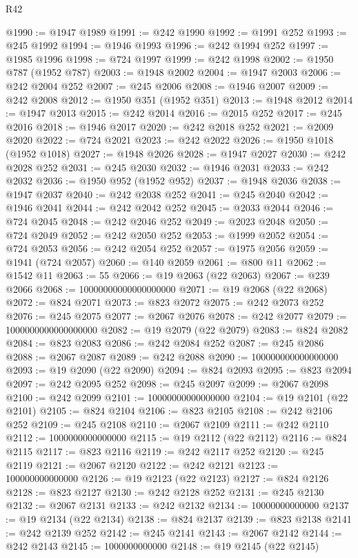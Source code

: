 \begin{lexlean}{R42}
\begin{coremodule}
{@1990 := @1947 @1989
@1991 := @242 @1990
@1992 := @1991 @252
@1993 := @245 @1992
@1994 := @1946 @1993
@1996 := @242 @1994 @252
@1997 := @1985 @1996
@1998 := @724 @1997
@1999 := @242 @1998
@2002 := @1950 @787 (@1952 @787)
@2003 := @1948 @2002
@2004 := @1947 @2003
@2006 := @242 @2004 @252
@2007 := @245 @2006
@2008 := @1946 @2007
@2009 := @242 @2008
@2012 := @1950 @351 (@1952 @351)
@2013 := @1948 @2012
@2014 := @1947 @2013
@2015 := @242 @2014
@2016 := @2015 @252
@2017 := @245 @2016
@2018 := @1946 @2017
@2020 := @242 @2018 @252
@2021 := @2009 @2020
@2022 := @724 @2021
@2023 := @242 @2022
@2026 := @1950 @1018 (@1952 @1018)
@2027 := @1948 @2026
@2028 := @1947 @2027
@2030 := @242 @2028 @252
@2031 := @245 @2030
@2032 := @1946 @2031
@2033 := @242 @2032
@2036 := @1950 @952 (@1952 @952)
@2037 := @1948 @2036
@2038 := @1947 @2037
@2040 := @242 @2038 @252
@2041 := @245 @2040
@2042 := @1946 @2041
@2044 := @242 @2042 @252
@2045 := @2033 @2044
@2046 := @724 @2045
@2048 := @242 @2046 @252
@2049 := @2023 @2048
@2050 := @724 @2049
@2052 := @242 @2050 @252
@2053 := @1999 @2052
@2054 := @724 @2053
@2056 := @242 @2054 @252
@2057 := @1975 @2056
@2059 := @1941 (@724 @2057)
@2060 := @140 @2059
@2061 := @800 @11
@2062 := @1542 @11
@2063 := 55
@2066 := @19 @2063 (@22 @2063)
@2067 := @239 @2066
@2068 := 10000000000000000000
@2071 := @19 @2068 (@22 @2068)
@2072 := @824 @2071
@2073 := @823 @2072
@2075 := @242 @2073 @252
@2076 := @245 @2075
@2077 := @2067 @2076
@2078 := @242 @2077
@2079 := 1000000000000000000
@2082 := @19 @2079 (@22 @2079)
@2083 := @824 @2082
@2084 := @823 @2083
@2086 := @242 @2084 @252
@2087 := @245 @2086
@2088 := @2067 @2087
@2089 := @242 @2088
@2090 := 100000000000000000
@2093 := @19 @2090 (@22 @2090)
@2094 := @824 @2093
@2095 := @823 @2094
@2097 := @242 @2095 @252
@2098 := @245 @2097
@2099 := @2067 @2098
@2100 := @242 @2099
@2101 := 10000000000000000
@2104 := @19 @2101 (@22 @2101)
@2105 := @824 @2104
@2106 := @823 @2105
@2108 := @242 @2106 @252
@2109 := @245 @2108
@2110 := @2067 @2109
@2111 := @242 @2110
@2112 := 1000000000000000
@2115 := @19 @2112 (@22 @2112)
@2116 := @824 @2115
@2117 := @823 @2116
@2119 := @242 @2117 @252
@2120 := @245 @2119
@2121 := @2067 @2120
@2122 := @242 @2121
@2123 := 100000000000000
@2126 := @19 @2123 (@22 @2123)
@2127 := @824 @2126
@2128 := @823 @2127
@2130 := @242 @2128 @252
@2131 := @245 @2130
@2132 := @2067 @2131
@2133 := @242 @2132
@2134 := 10000000000000
@2137 := @19 @2134 (@22 @2134)
@2138 := @824 @2137
@2139 := @823 @2138
@2141 := @242 @2139 @252
@2142 := @245 @2141
@2143 := @2067 @2142
@2144 := @242 @2143
@2145 := 1000000000000
@2148 := @19 @2145 (@22 @2145)
}
\end{coremodule}
\end{lexlean}
